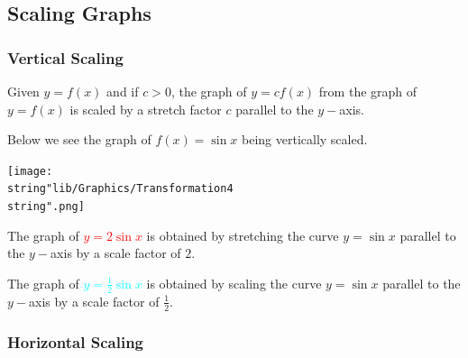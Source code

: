 \documentclass[11pt,a4paper]{book}
\begin{document}
\subsection{Scaling Graphs}

\subsubsection{Vertical Scaling}

\begin{tcolorbox}[colback=blue!5, colframe=black,boxrule=.4pt, sharpish corners]

Given $y=f\left(x\right)$ and if $c>0$, the graph of $y=cf\left(x\right)$ from the graph of $y=f\left(x\right)$ is scaled by a stretch factor $c$ parallel to the $y-$axis.

\end{tcolorbox}

\medskip

Below we see the graph of $f\left(x\right)=\sin x$ being vertically
scaled.

\bigskip{}

\begin{minipage}[t]{0.5\textwidth}
\begin{center}
\texttt{[image: \\string"lib/Graphics/Transformation4\\string".png]}
\par\end{center}

\end{minipage}
\begin{minipage}[t]{0.5\textwidth}

The graph of \textcolor{red}{$y=2\sin x$} is obtained by stretching
the curve $y=\sin x$ parallel to the $y-$axis by a scale factor
of $2$.

The graph of \textcolor{cyan}{${\displaystyle y=\frac{1}{2}\sin x}$}
is obtained by scaling the curve $y=\sin x$ parallel to the $y-$axis
by a scale factor of ${\displaystyle \frac{1}{2}}$.

\end{minipage}

\subsubsection{Horizontal Scaling}
\end{document}

